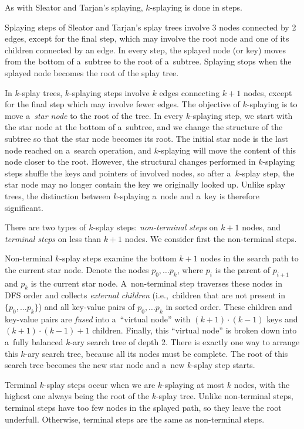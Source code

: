 As with Sleator and Tarjan's splaying, $k$-splaying is done in steps.

Splaying steps of Sleator and Tarjan's splay trees involve 3 nodes connected
by 2 edges, except for the final step, which may involve the root node and one
of its children connected by an edge. In every step, the splayed node (or key)
moves from the bottom of a~subtree to the root of a~subtree.
Splaying stops when the splayed node becomes the root of the splay tree.

In $k$-splay trees, $k$-splaying steps involve $k$ edges connecting
$k+1$ nodes, except for the final step which may involve fewer edges.
The objective of $k$-splaying is to move a~\emph{star node} to the
root of the tree. In every $k$-splaying step, we start with the star node
at the bottom of a~subtree, and we change the structure of the subtree
so that the star node becomes its root.
The initial star node is the last node reached on a~search operation, and
$k$-splaying will move the content of this node closer to the root.
However, the structural changes performed in $k$-splaying steps shuffle
the keys and pointers of involved nodes, so after a~$k$-splay step,
the star node may no longer contain the key we originally looked up.
Unlike splay trees, the distinction between $k$-splaying a~node and a~key
is therefore significant.

There are two types of $k$-splay steps: \emph{non-terminal steps} on
$k+1$ nodes, and \emph{terminal steps} on less than $k+1$ nodes.
We consider first the non-terminal steps.

Non-terminal $k$-splay steps examine the bottom $k+1$ nodes in the search
path to the current star node. Denote the nodes $p_0,\ldots p_{k}$, where $p_i$
is the parent of $p_{i+1}$ and $p_k$ is the current star node. A~non-terminal
step traverses these nodes in DFS order and collects \emph{external children}
(i.e.,\ children that are not present in $\{p_0,\ldots p_k\}$) and all key-value
pairs of $p_0,\ldots p_k$ in sorted order. These children and key-value pairs
are \emph{fused} into a~``virtual node'' with $(k+1)\cdot (k-1)$ keys and
$(k+1)\cdot(k-1) + 1$ children. Finally, this ``virtual node'' is broken down
into a~fully balanced $k$-ary search tree of depth 2. There is exactly one
way to arrange this $k$-ary search tree, because all its nodes must be complete.
The root of this search tree becomes the new star node and a~new $k$-splay
step starts.

Terminal $k$-splay steps occur when we are $k$-splaying at most $k$
nodes, with the highest one always being the root of the $k$-splay tree.
Unlike non-terminal steps, terminal steps have too few nodes in the splayed
path, so they leave the root underfull. Otherwise, terminal steps are the same
as non-terminal steps.

